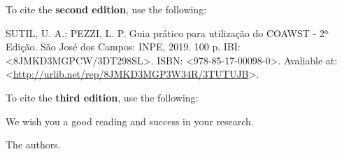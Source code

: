 \newpage
\noindent To cite the \textbf{second edition}, use the following:
\bigskip

\noindent SUTIL, U. A.; PEZZI, L. P. Guia prático para utilização do COAWST - 2ª Edição. São José dos Campos: INPE, 2019. 100 p. IBI: <8JMKD3MGPCW/3DT298SL>. ISBN: <978-85-17-00098-0>. Avaliable at: <\textcolor{bleu_cite}{\href{http://urlib.net/rep/8JMKD3MGP3W34R/3TUTUJB}{http://urlib.net/rep/8JMKD3MGP3W34R/3TUTUJB}}>. 

\bigskip

\noindent To cite the \textbf{third edition}, use the following:
\bigskip

\noindent We wish you a good reading and success in your research.
\bigskip

\noindent The authors.
